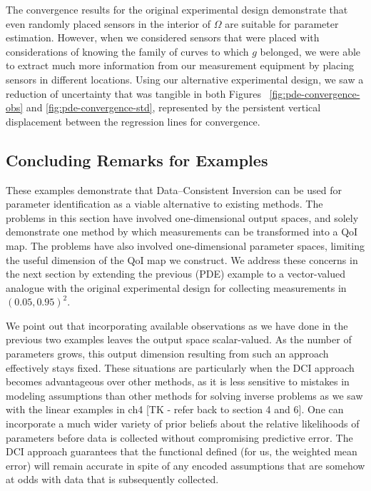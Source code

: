 The convergence results for the original experimental design demonstrate that even randomly placed sensors in the interior of $\Omega$ are suitable for parameter estimation.
However, when we considered sensors that were placed with considerations of knowing the family of curves to which $g$ belonged, we were able to extract much more information from our measurement equipment by placing sensors in different locations.
Using our alternative experimental design, we saw a reduction of uncertainty that was tangible in both Figures~ \ref{fig:pde-convergence-obs} and \ref{fig:pde-convergence-std}, represented by the persistent vertical displacement between the regression lines for convergence.


\FloatBarrier
\subsection{Concluding Remarks for Examples}

These examples demonstrate that Data--Consistent Inversion can be used for parameter identification as a viable alternative to existing methods.
The problems in this section have involved one-dimensional output spaces, and solely demonstrate one method by which measurements can be transformed into a QoI map.
The problems have also involved one-dimensional parameter spaces, limiting the useful dimension of the QoI map we construct.
We address these concerns in the next section by extending the previous (PDE) example to a vector-valued analogue with the original experimental design for collecting measurements in $(0.05, 0.95)^2$.

We point out that incorporating available observations as we have done in the previous two examples leaves the output space scalar-valued.
As the number of parameters grows, this output dimension resulting from such an approach effectively stays fixed.
These situations are particularly when the DCI approach becomes advantageous over other methods, as it is less sensitive to mistakes in modeling assumptions than other methods for solving inverse problems as we saw with the linear examples in ch4 [TK - refer back to section 4 and 6].
One can incorporate a much wider variety of prior beliefs about the relative likelihoods of parameters before data is collected without compromising predictive error.
The DCI approach guarantees that the functional defined (for us, the weighted mean error) will remain accurate in spite of any encoded assumptions that are somehow at odds with data that is subsequently collected.
